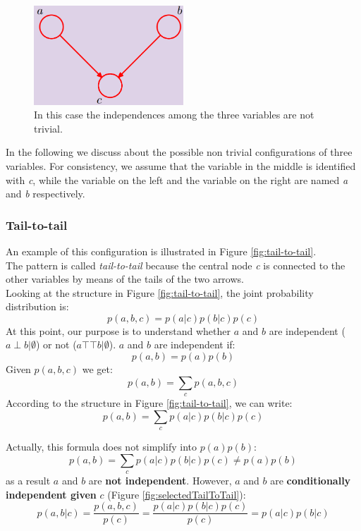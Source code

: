 \begin{figure}
    \centering
    \includegraphics[width=0.5\textwidth]{images/nonTrivialThreeVars.png}
    \caption{In this case the independences among the three variables are not trivial.}
    \label{fig:nonTrivialThreeVars}
\end{figure}

In the following we discuss about the possible non trivial configurations of three variables. For consistency, we assume that the variable in the middle is identified with \textit{c}, while the variable on the left and the variable on the right are named \textit{a} and \textit{b} respectively.

\subsubsection{Tail-to-tail}
An example of this configuration is illustrated in Figure \ref{fig:tail-to-tail}.\\
The pattern is called \textit{tail-to-tail} because the central node \textit{c} is connected to the other variables by means of the tails of the two arrows.\\
Looking at the structure in Figure \ref{fig:tail-to-tail}, the joint probability distribution is:
$$p(a,b,c) = p(a|c)p(b|c)p(c)$$
At this point, our purpose is to understand whether $a$ and $b$ are independent ($a \perp b | \emptyset$) or not ($a \top\!\!\!\!\top b | \emptyset$). $a$ and $b$ are independent if:
$$p(a,b) = p(a)p(b)$$
Given $p(a,b,c)$ we get:
$$p(a,b) = \sum_c p(a,b,c)$$
According to the structure in Figure \ref{fig:tail-to-tail}, we can write:
$$p(a,b) = \sum_c p(a|c)p(b|c)p(c)$$

Actually, this formula does not simplify into $p(a)p(b)$:
$$p(a,b) = \sum_c p(a|c)p(b|c)p(c) \neq p(a)p(b)$$
as a result $a$ and $b$ are \textbf{not independent}. \newline
However, $a$ and $b$ are \textbf{conditionally independent given} $c$ (Figure \ref{fig:selectedTailToTail}):
\begin{equation*}
p(a,b|c) = \frac{p(a,b,c)}{p(c)} = \frac{p(a|c)p(b|c)p(c)}{p(c)} = p(a|c)p(b|c)
\end{equation*}

